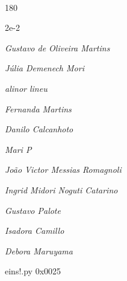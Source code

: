 \documentclass[12pt]{article}
\begin{document}
\pagebreak			

	\ 
	\vfill
	\begin{turn}{180}	
		\begin{minipage}{\textwidth}
		  	\ttfamily %
			\centering
			{\Huge 2e-2}
		  
			\hfill
		  
			

\textit{\small Gustavo de Oliveira Martins}

\textit{\small Júlia Demenech Mori}

\textit{\small alinor lineu}

\textit{\small Fernanda Martins}

\textit{\small Danilo Calcanhoto}

\textit{\small Mari P}

\textit{\small João Victor Messias Romagnoli}

\textit{\small Ingrid Midori Noguti Catarino}

\textit{\small Gustavo Palote}

\textit{\small Isadora Camillo}

\textit{\small Debora Maruyama}

\bigskip

eins!.py
0x0025


		\end{minipage}	
	\end{turn}
	\vfill
	\

\pagebreak
\end{document}
